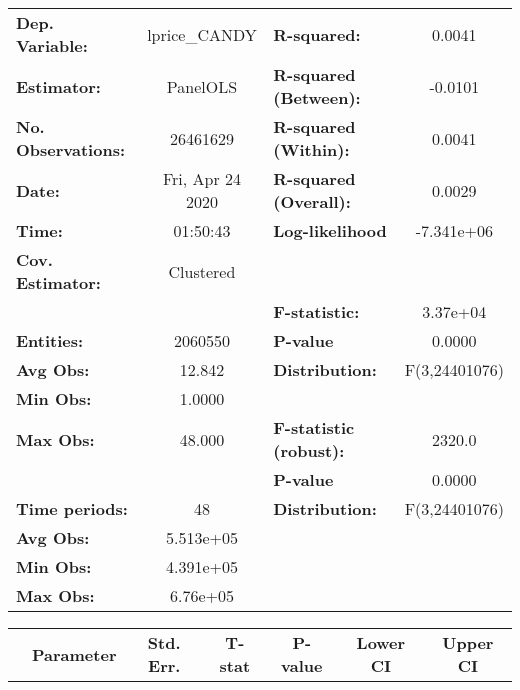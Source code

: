 \documentclass{report}
\begin{document}
\begin{center}
\begin{tabular}{lclc}
\toprule
\textbf{Dep. Variable:}    &   lprice\_CANDY    & \textbf{  R-squared:         }   &      0.0041      \\
\textbf{Estimator:}        &      PanelOLS      & \textbf{  R-squared (Between):}  &     -0.0101      \\
\textbf{No. Observations:} &      26461629      & \textbf{  R-squared (Within):}   &      0.0041      \\
\textbf{Date:}             &  Fri, Apr 24 2020  & \textbf{  R-squared (Overall):}  &      0.0029      \\
\textbf{Time:}             &      01:50:43      & \textbf{  Log-likelihood     }   &    -7.341e+06    \\
\textbf{Cov. Estimator:}   &     Clustered      & \textbf{                     }   &                  \\
\textbf{}                  &                    & \textbf{  F-statistic:       }   &     3.37e+04     \\
\textbf{Entities:}         &      2060550       & \textbf{  P-value            }   &      0.0000      \\
\textbf{Avg Obs:}          &       12.842       & \textbf{  Distribution:      }   &  F(3,24401076)   \\
\textbf{Min Obs:}          &       1.0000       & \textbf{                     }   &                  \\
\textbf{Max Obs:}          &       48.000       & \textbf{  F-statistic (robust):} &      2320.0      \\
\textbf{}                  &                    & \textbf{  P-value            }   &      0.0000      \\
\textbf{Time periods:}     &         48         & \textbf{  Distribution:      }   &  F(3,24401076)   \\
\textbf{Avg Obs:}          &     5.513e+05      & \textbf{                     }   &                  \\
\textbf{Min Obs:}          &     4.391e+05      & \textbf{                     }   &                  \\
\textbf{Max Obs:}          &      6.76e+05      & \textbf{                     }   &                  \\
\bottomrule
\end{tabular}
\begin{tabular}{lcccccc}
                           & \textbf{Parameter} & \textbf{Std. Err.} & \textbf{T-stat} & \textbf{P-value} & \textbf{Lower CI} & \textbf{Upper CI}  \\

\end{tabular}
\end{center}
\end{document}
